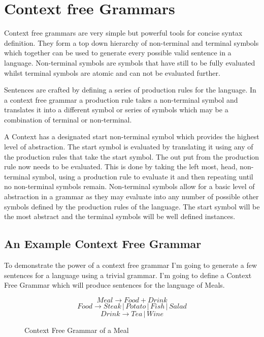 \section{Context free Grammars}

Context free grammars are very simple but powerful tools for concise syntax definition.  They form a top down hierarchy of non-terminal and terminal symbols which together can be used to generate every possible valid sentence in a language.  Non-terminal symbols are symbols that have still to be fully evaluated whilst terminal symbols are atomic and can not be evaluated further. 





Sentences are crafted by defining a series of production rules for the language.  In a context free grammar a production rule takes a non-terminal symbol and translates it into a different symbol or series of symbols which may be a combination of terminal or non-terminal. 



A Context has a designated start non-terminal symbol which provides the highest level of abstraction.  The start symbol is evaluated by translating it using any of the production rules that take the start symbol.  The out put from the production rule now needs to be evaluated.  This is done by taking the left most, head, non-terminal symbol, using a production rule to evaluate it and then repeating until no non-terminal symbols remain. 
Non-terminal symbols allow for a basic level of abstraction in a grammar as they may evaluate into any number of possible other symbols defined by the production rules of the language.  The start symbol will be the most abstract and the terminal symbols will be well defined instances. 

\subsection{An Example Context Free Grammar}

To demonstrate the power of a context free grammar I'm going to generate a few sentences for a language using a trivial grammar.  I'm going to define a Context Free Grammar which will produce sentences for the language of Meals.  

\begin{figure}
\[ Meal \to Food + Drink \]
\[ Food \to Steak \,|\, Potato \,|\, Fish \,|\, Salad \]
\[ Drink \to Tea \,|\, Wine \]

\caption{Context Free Grammar of a Meal}
\end{figure}

